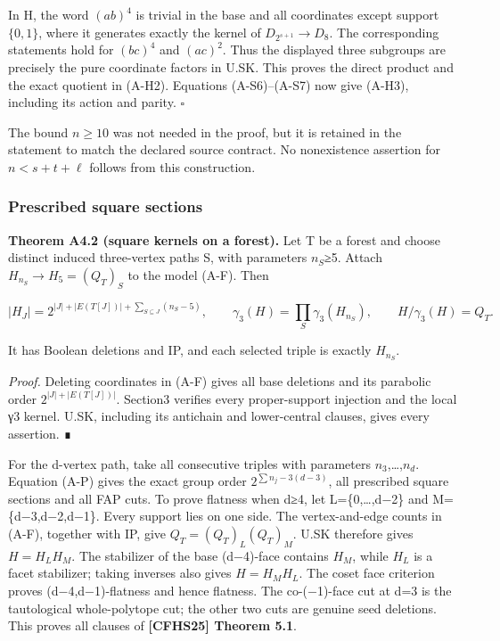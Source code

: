 \documentclass[
  11pt,
  a4paper,
]{article}
\newcounter{none} %
\begin{document}
In H, the word \((ab)^4\) is trivial in the base and all coordinates
except support \(\{0,1\}\), where it generates exactly the kernel of
\(D_{2^{s+1}}\to D_8\). The corresponding statements hold for \((bc)^4\)
and \((ac)^2\). Thus the displayed three subgroups are precisely the
pure coordinate factors in U.SK. This proves the direct product and the
exact quotient in (A-H2). Equations (A-S6)--(A-S7) now give (A-H3),
including its action and parity. \(\square\)

The bound \(n\ge10\) was not needed in the proof, but it is retained in
the statement to match the declared source contract. No nonexistence
assertion for \(n<s+t+\ell\) follows from this construction.

\subsubsection{Prescribed square
sections}\label{prescribed-square-sections}

\textbf{Theorem A4.2 (square kernels on a forest).} Let T be a forest
and choose distinct induced three-vertex paths S, with parameters
\(n_S\)≥5. Attach \(H_{n_S}\to H_5=(Q_T)_S\) to the model (A-F). Then

\[
 |H_J|=2^{|J|+|E(T[J])|+\sum_{S\subseteq J}(n_S-5)},\qquad
 \gamma_3(H)=\prod_S\gamma_3(H_{n_S}),\qquad H/\gamma_3(H)=Q_T.
 \tag{A-P}
\]

It has Boolean deletions and IP, and each selected triple is exactly
\(H_{n_S}\).

\emph{Proof.} Deleting coordinates in (A-F) gives all base deletions and
its parabolic order \(2^{|J|+|E(T[J])|}\). Section3 verifies every
proper-support injection and the local γ3 kernel. U.SK, including its
antichain and lower-central clauses, gives every assertion. ∎

For the d-vertex path, take all consecutive triples with parameters
\(n_3\),\ldots,\(n_d\). Equation (A-P) gives the exact group order
\(2^{\sum n_j-3(d-3)}\), all prescribed square sections and all FAP
cuts. To prove flatness when d≥4, let L=\{0,\ldots,d−2\} and
M=\{d−3,d−2,d−1\}. Every support lies on one side. The vertex-and-edge
counts in (A-F), together with IP, give \(Q_T=(Q_T)_L(Q_T)_M\). U.SK
therefore gives \(H=H_LH_M\). The stabilizer of the base (d−4)-face
contains \(H_M\), while \(H_L\) is a facet stabilizer; taking inverses
also gives \(H=H_MH_L\). The coset face criterion proves
(d−4,d−1)-flatness and hence flatness. The co-(−1)-face cut at d=3 is
the tautological whole-polytope cut; the other two cuts are genuine seed
deletions. This proves all clauses of \textbf{{[}CFHS25{]} Theorem 5.1}.
\end{document}
